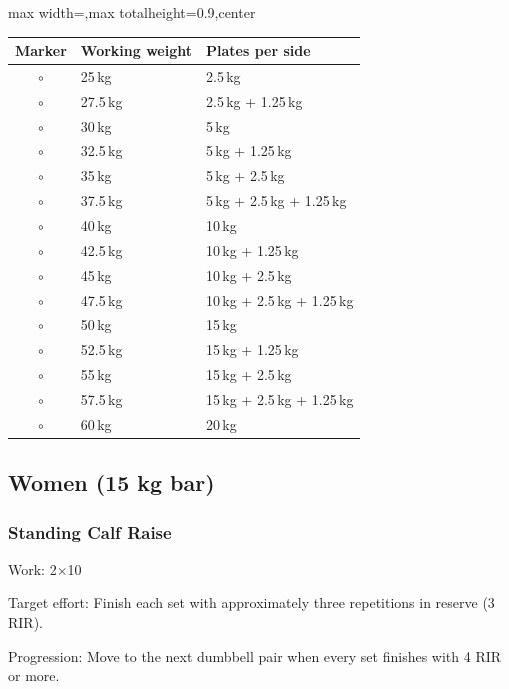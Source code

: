 \documentclass[11pt,a4paper]{article}
\newcommand{\tablearraystretch}{1.15}
\begin{document}
\begin{center}
\renewcommand{\arraystretch}{\tablearraystretch}
\begin{adjustbox}{max width=\linewidth,max totalheight=0.9\textheight,center}
\begin{tabular}{cll}
\toprule
Marker & Working weight & Plates per side \\
\midrule
$\circ$ & 25\,kg & 2.5\,kg \\
$\circ$ & 27.5\,kg & 2.5\,kg + 1.25\,kg \\
$\circ$ & 30\,kg & 5\,kg \\
$\circ$ & 32.5\,kg & 5\,kg + 1.25\,kg \\
$\circ$ & 35\,kg & 5\,kg + 2.5\,kg \\
$\circ$ & 37.5\,kg & 5\,kg + 2.5\,kg + 1.25\,kg \\
$\circ$ & 40\,kg & 10\,kg \\
$\circ$ & 42.5\,kg & 10\,kg + 1.25\,kg \\
$\circ$ & 45\,kg & 10\,kg + 2.5\,kg \\
$\circ$ & 47.5\,kg & 10\,kg + 2.5\,kg + 1.25\,kg \\
$\circ$ & 50\,kg & 15\,kg \\
$\circ$ & 52.5\,kg & 15\,kg + 1.25\,kg \\
$\circ$ & 55\,kg & 15\,kg + 2.5\,kg \\
$\circ$ & 57.5\,kg & 15\,kg + 2.5\,kg + 1.25\,kg \\
$\circ$ & 60\,kg & 20\,kg \\
\bottomrule
\end{tabular}
\end{adjustbox}
\renewcommand{\arraystretch}{1}
\end{center}

\newpage
\subsection{Women (15 kg bar)}

\subsubsection{Standing Calf Raise}

Work: 2$\times$10

Target effort: Finish each set with approximately three repetitions in reserve (3 RIR).

Progression: Move to the next dumbbell pair when every set finishes with 4 RIR or more.
\end{document}
